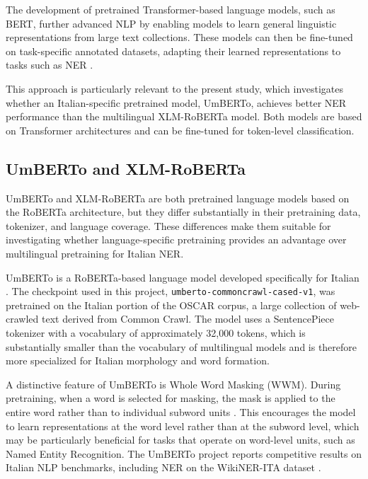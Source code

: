 The development of pretrained Transformer-based language models, such as BERT, further advanced NLP by enabling models to learn general linguistic representations from large text collections. These models can then be fine-tuned on task-specific annotated datasets, adapting their learned representations to tasks such as NER \cite{devlin2019bert}.

This approach is particularly relevant to the present study, which investigates whether an Italian-specific pretrained model, UmBERTo, achieves better NER performance than the multilingual XLM-RoBERTa model. Both models are based on Transformer architectures and can be fine-tuned for token-level classification.


\subsection{UmBERTo and XLM-RoBERTa}
\label{subsec:berts}

UmBERTo and XLM-RoBERTa are both pretrained language models based on the RoBERTa architecture, but they differ substantially in their pretraining data, tokenizer, and language coverage. These differences make them suitable for investigating whether language-specific pretraining provides an advantage over multilingual pretraining for Italian NER.

UmBERTo is a RoBERTa-based language model developed specifically for Italian \cite{musixmatch2020umberto}. The checkpoint used in this project, \texttt{umberto-commoncrawl-cased-v1}, was pretrained on the Italian portion of the OSCAR corpus, a large collection of web-crawled text derived from Common Crawl. The model uses a SentencePiece tokenizer with a vocabulary of approximately 32,000 tokens, which is substantially smaller than the vocabulary of multilingual models and is therefore more specialized for Italian morphology and word formation.

A distinctive feature of UmBERTo is Whole Word Masking (WWM). During pretraining, when a word is selected for masking, the mask is applied to the entire word rather than to individual subword units \cite{musixmatch2020umberto}. This encourages the model to learn representations at the word level rather than at the subword level, which may be particularly beneficial for tasks that operate on word-level units, such as Named Entity Recognition. The UmBERTo project reports competitive results on Italian NLP benchmarks, including NER on the WikiNER-ITA dataset \cite{musixmatch2020umberto}.

